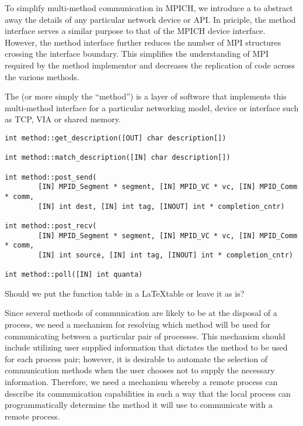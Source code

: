 To simplify multi-method communication in MPICH, we introduce a
 to abstract away the details of any particular
network device or API.  In priciple, the method interface serves a similar
purpose to that of the MPICH device interface.  However, the method interface
further reduces the number of MPI structures crossing the interface boundary.
This simplifies the understanding of MPI required by the method implementor and
decreases the replication of code across the various methods.

The  (or more simply the ``method'') is a layer of
software that implements this multi-method interface for a particular
networking model, device or interface such as TCP, VIA or shared memory.

\begin{verbatim}
int method::get_description([OUT] char description[])

int method::match_description([IN] char description[])

int method::post_send(
        [IN] MPID_Segment * segment, [IN] MPID_VC * vc, [IN] MPID_Comm * comm,
        [IN] int dest, [IN] int tag, [INOUT] int * completion_cntr)

int method::post_recv(
        [IN] MPID_Segment * segment, [IN] MPID_VC * vc, [IN] MPID_Comm * comm,
        [IN] int source, [IN] int tag, [INOUT] int * completion_cntr)

int method::poll([IN] int quanta)
\end{verbatim}

\begin{cmt}[BRT]
Should we put the function table in a \LaTeX table or leave it as is?
\end{cmt}

Since several methods of communication are likely to be at the disposal of a
process, we need a mechanism for resolving which method will be used for
communicating between a particular pair of processes.  This mechanism should
include utilizing user supplied information that dictates the method to be used
for each process pair; however, it is desirable to automate the selection of
communication methods when the user chooses not to supply the necessary
information.  Therefore, we need a mechanism whereby a remote process can
describe its communication capabilities in such a way that the local process
can programmatically determine the method it will use to communicate with a
remote process.

